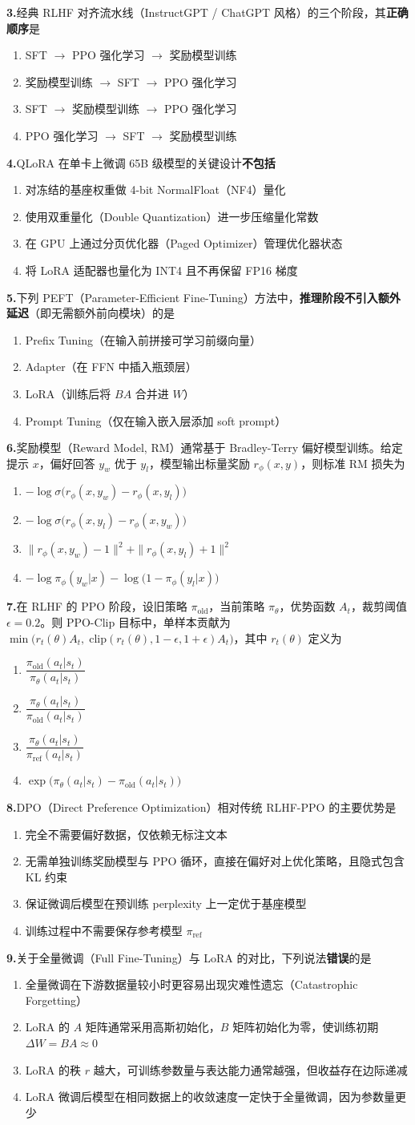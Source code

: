 \documentclass[11pt,a4paper]{article}
\newcommand{\qitem}[2]{%
  \noindent\textbf{#1.}\;#2\par
  \vspace{0.3em}
}
\newcommand{\fourchoices}[4]{%
  \begin{enumerate}[label=(\Alph*),leftmargin=2.2em,itemsep=0pt,parsep=0pt,topsep=0pt]
    \setlength{\itemindent}{0pt}
    \item #1
    \item #2
    \item #3
    \item #4
  \end{enumerate}
  \vspace{0.4em}
}
\begin{document}
\qitem{3}{经典 RLHF 对齐流水线（InstructGPT / ChatGPT 风格）的三个阶段，其\textbf{正确顺序}是}{}
\fourchoices{SFT $\to$ PPO 强化学习 $\to$ 奖励模型训练}{奖励模型训练 $\to$ SFT $\to$ PPO 强化学习}{SFT $\to$ 奖励模型训练 $\to$ PPO 强化学习}{PPO 强化学习 $\to$ SFT $\to$ 奖励模型训练}

\qitem{4}{QLoRA 在单卡上微调 65B 级模型的关键设计\textbf{不包括}}{}
\fourchoices{对冻结的基座权重做 4-bit NormalFloat（NF4）量化}{使用双重量化（Double Quantization）进一步压缩量化常数}{在 GPU 上通过分页优化器（Paged Optimizer）管理优化器状态}{将 LoRA 适配器也量化为 INT4 且不再保留 FP16 梯度}

\qitem{5}{下列 PEFT（Parameter-Efficient Fine-Tuning）方法中，\textbf{推理阶段不引入额外延迟}（即无需额外前向模块）的是}{}
\fourchoices{Prefix Tuning（在输入前拼接可学习前缀向量）}{Adapter（在 FFN 中插入瓶颈层）}{LoRA（训练后将 $BA$ 合并进 $W$）}{Prompt Tuning（仅在输入嵌入层添加 soft prompt）}

\qitem{6}{奖励模型（Reward Model, RM）通常基于 Bradley-Terry 偏好模型训练。给定提示 $x$，偏好回答 $y_w$ 优于 $y_l$，模型输出标量奖励 $r_\phi(x,y)$，则标准 RM 损失为}{}
\fourchoices{$-\log\sigma\!\big(r_\phi(x,y_w)-r_\phi(x,y_l)\big)$}{$-\log\sigma\!\big(r_\phi(x,y_l)-r_\phi(x,y_w)\big)$}{$\|r_\phi(x,y_w)-1\|^2+\|r_\phi(x,y_l)+1\|^2$}{$-\log\pi_\phi(y_w|x)-\log\big(1-\pi_\phi(y_l|x)\big)$}

\qitem{7}{在 RLHF 的 PPO 阶段，设旧策略 $\pi_{\mathrm{old}}$，当前策略 $\pi_\theta$，优势函数 $A_t$，裁剪阈值 $\epsilon=0.2$。则 PPO-Clip 目标中，单样本贡献为 $\min\!\big(r_t(\theta)A_t,\;\mathrm{clip}(r_t(\theta),1-\epsilon,1+\epsilon)A_t\big)$，其中 $r_t(\theta)$ 定义为}{}
\fourchoices{$\dfrac{\pi_{\mathrm{old}}(a_t|s_t)}{\pi_\theta(a_t|s_t)}$}{$\dfrac{\pi_\theta(a_t|s_t)}{\pi_{\mathrm{old}}(a_t|s_t)}$}{$\dfrac{\pi_\theta(a_t|s_t)}{\pi_{\mathrm{ref}}(a_t|s_t)}$}{$\exp\!\big(\pi_\theta(a_t|s_t)-\pi_{\mathrm{old}}(a_t|s_t)\big)$}

\qitem{8}{DPO（Direct Preference Optimization）相对传统 RLHF-PPO 的主要优势是}{}
\fourchoices{完全不需要偏好数据，仅依赖无标注文本}{无需单独训练奖励模型与 PPO 循环，直接在偏好对上优化策略，且隐式包含 KL 约束}{保证微调后模型在预训练 perplexity 上一定优于基座模型}{训练过程中不需要保存参考模型 $\pi_{\mathrm{ref}}$}

\qitem{9}{关于全量微调（Full Fine-Tuning）与 LoRA 的对比，下列说法\textbf{错误}的是}{}
\fourchoices{全量微调在下游数据量较小时更容易出现灾难性遗忘（Catastrophic Forgetting）}{LoRA 的 $A$ 矩阵通常采用高斯初始化，$B$ 矩阵初始化为零，使训练初期 $\Delta W=BA\approx 0$}{LoRA 的秩 $r$ 越大，可训练参数量与表达能力通常越强，但收益存在边际递减}{LoRA 微调后模型在相同数据上的收敛速度一定快于全量微调，因为参数量更少}
\end{document}
